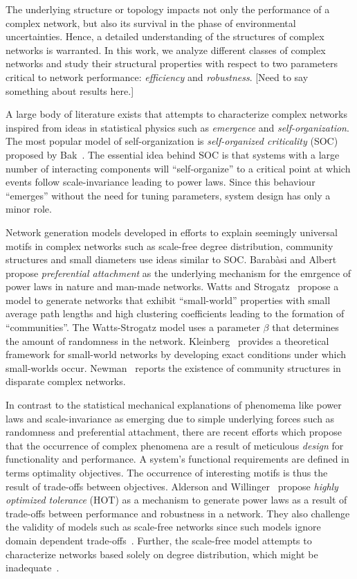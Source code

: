 \documentclass[twocolumn,showpacs,preprintnumbers,amsmath,amssymb]{revtex4}
\begin{document}
The underlying structure or topology impacts not only the performance of a complex network, but also its survival in the phase of environmental uncertainties. Hence, a detailed understanding of the structures of complex networks is warranted. In this work, we analyze different classes of complex networks and study their structural properties with respect to two parameters critical to network performance: \textit{efficiency} and \textit{robustness}. [Need to say something about results here.]

A large body of literature exists that attempts to characterize complex networks inspired from ideas in statistical physics such as \textit{emergence} and \textit{self-organization}. The most popular model of self-organization is \textit{self-organized criticality} (SOC) proposed by Bak~\cite{soc}. %
The essential idea behind SOC is that systems with a large number of interacting components will ``self-organize'' to a critical point at which events follow scale-invariance leading to power laws. Since this behaviour ``emerges'' without the need for tuning parameters, system design has only a minor role. %

Network generation models developed in efforts to explain seemingly universal motifs in complex networks such as scale-free degree distribution, community structures and small diameters use ideas similar to SOC. Barab\`{a}si and Albert~\cite{barabasi} propose \textit{preferential attachment} as the underlying mechanism for the emrgence of power laws in nature and man-made networks. Watts and Strogatz~\cite{watts} propose a model to generate networks that exhibit ``small-world'' properties with small average path lengths and high clustering coefficients leading to the formation of ``communities''. The Watts-Strogatz model uses a parameter $\beta$ that determines the amount of randomness in the network. Kleinberg~\cite{kleinberg} provides a theoretical framework for small-world networks by developing exact conditions under which small-worlds occur. Newman~\cite{newman} reports the existence of community structures in disparate complex networks.

In contrast to the statistical mechanical explanations of phenomema like power laws and scale-invariance as emerging due to simple underlying forces such as randomness and preferential attachment, there are recent efforts which propose that the occurrence of complex phenomena are a result of meticulous \textit{design} for functionality and performance. A system's functional requirements are defined in terms optimality objectives. The occurrence of interesting motifs is thus the result of trade-offs between objectives. Alderson and Willinger~\cite{hot} propose \textit{highly optimized tolerance} (HOT) as a mechanism to generate power laws as a result of trade-offs between performance and robustness in a network. They also challenge the validity of models such as scale-free networks since such models ignore domain dependent trade-offs~\cite{hotnets}. Further, the scale-free model attempts to characterize networks based solely on degree distribution, which might be inadequate~\cite{hot-mathematics09}.
\end{document}
